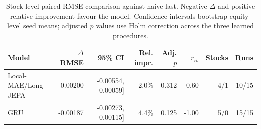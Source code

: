 \begin{table}[t]
\centering
\small
\caption{Stock-level paired RMSE comparison against naive-last. Negative $\Delta$ and positive relative improvement favour the model. Confidence intervals bootstrap equity-level seed means; adjusted $p$ values use Holm correction across the three learned procedures.}
\label{tab:paired_rmse_naive}
\begin{tabular}{lrrrrrrr}
\toprule
Model & $\Delta$RMSE & 95\% CI & Rel. impr. & Adj. $p$ & $r_{rb}$ & Stocks & Runs \\
\midrule
Local-MAE/Long-JEPA & -0.00200 & [-0.00554, 0.00059] & 2.0\% & 0.312 & -0.60 & 4/1 & 10/15 \\
GRU & -0.00187 & [-0.00273, -0.00115] & 4.4\% & 0.125 & -1.00 & 5/0 & 15/15 \\
\bottomrule
\end{tabular}
\end{table}

